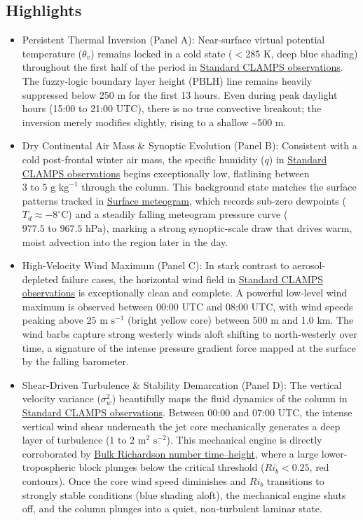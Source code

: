 \documentclass[11pt]{article}
\begin{document}
\subsection*{Highlights}
\begin{itemize}
  \item Persistent Thermal Inversion (Panel A): Near-surface virtual potential temperature ($\theta_v$) remains locked in a cold state ($< 285\text{ K}$, deep blue shading) throughout the first half of the period in \hyperref[fig:stable_good_dl_c2:stable_good_dl_c2_instrument_template_4panel]{Standard CLAMPS observations}. The fuzzy-logic boundary layer height (PBLH) line remains heavily suppressed below 250 m for the first 13 hours. Even during peak daylight hours (15:00 to 21:00 UTC), there is no true convective breakout; the inversion merely modifies slightly, rising to a shallow \textasciitilde{}500 m.
  \item Dry Continental Air Mass \& Synoptic Evolution (Panel B): Consistent with a cold post-frontal winter air mass, the specific humidity ($q$) in \hyperref[fig:stable_good_dl_c2:stable_good_dl_c2_instrument_template_4panel]{Standard CLAMPS observations} begins exceptionally low, flatlining between $3\text{ to }5\text{ g kg}^{-1}$ through the column. This background state matches the surface patterns tracked in \hyperref[fig:stable_good_dl_c2:stable_good_dl_c2_aux_surface_meteogram]{Surface meteogram}, which records sub-zero dewpoints ($T_d \approx -8^\circ\text{C}$) and a steadily falling meteogram pressure curve ($977.5\text{ to }967.5\text{ hPa}$), marking a strong synoptic-scale draw that drives warm, moist advection into the region later in the day.
  \item High-Velocity Wind Maximum (Panel C): In stark contrast to aerosol-depleted failure cases, the horizontal wind field in \hyperref[fig:stable_good_dl_c2:stable_good_dl_c2_instrument_template_4panel]{Standard CLAMPS observations} is exceptionally clean and complete. A powerful low-level wind maximum is observed between 00:00 UTC and 08:00 UTC, with wind speeds peaking above $25\text{ m s}^{-1}$ (bright yellow core) between 500 m and 1.0 km. The wind barbs capture strong westerly winds aloft shifting to north-westerly over time, a signature of the intense pressure gradient force mapped at the surface by the falling barometer.
  \item Shear-Driven Turbulence \& Stability Demarcation (Panel D): The vertical velocity variance ($\sigma_w^2$) beautifully maps the fluid dynamics of the column in \hyperref[fig:stable_good_dl_c2:stable_good_dl_c2_instrument_template_4panel]{Standard CLAMPS observations}. Between 00:00 and 07:00 UTC, the intense vertical wind shear underneath the jet core mechanically generates a deep layer of turbulence ($1\text{ to }2\text{ m}^2\text{ s}^{-2}$). This mechanical engine is directly corroborated by \hyperref[fig:stable_good_dl_c2:stable_good_dl_c2_aux_rib_timeheight]{Bulk Richardson number time–height}, where a large lower-tropospheric block plunges below the critical threshold ($Ri_b < 0.25$, red contours). Once the core wind speed diminishes and $Ri_b$ transitions to strongly stable conditions (blue shading aloft), the mechanical engine shuts off, and the column plunges into a quiet, non-turbulent laminar state.

\end{itemize}
\end{document}
